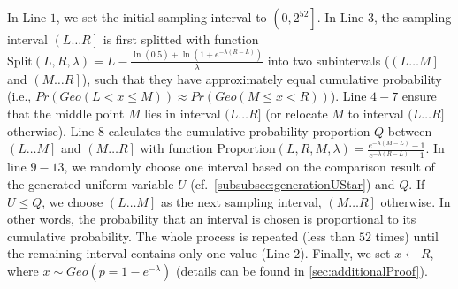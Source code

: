 In Line $1$, we set the initial sampling interval to $\left(0,2^{52}\right] $.
In Line $ 3$, the sampling interval $\left(L\ldots R\right] $ is first splitted with function $\text{Split}\left(L,R,\lambda\right)=L-\frac{\ln\left(0.5\right)+\ln\left(1+e^{-\lambda\left(R-L\right) }\right) }{\lambda}$ into two subintervals ($\left(L\ldots M\right] $ and $\left(M\ldots R\right] $), such that they have approximately equal cumulative probability (i.e., $Pr\left(Geo\left(L<x\leq M\right) \right) \approx Pr \left(Geo\left(M  \leq x  < R\right) \right)  $).
    Line $4-7$ ensure that the middle point $M$ lies in interval $(L\ldots R]$ (or relocate $M$ to interval $(L\ldots R]$ otherwise).
    Line $8$ calculates the cumulative probability proportion $Q$ between $\left(L\ldots M\right] $ and $\left(M\ldots R\right] $ with function $\text{Proportion}\left(L,R,M,\lambda\right)=\frac{e^{-\lambda\left(M-L\right) }-1}{e^{-\lambda\left(R-L\right) }-1} $.
    In line $9-13$, we randomly choose one interval based on the comparison result of the generated uniform variable $U$ (cf.~\autoref{subsubsec:generationUStar}) and $Q$.
    If $U \leq Q$, we choose $\left(L\ldots M\right] $ as the next sampling interval, $\left(M\ldots R\right] $ otherwise. In other words, the probability that an interval is chosen is proportional to its cumulative probability.
    The whole process is repeated (less than $52$ times) until the remaining interval contains only one value (Line $2$). Finally, we set $x\gets R$, where $x\sim Geo\left(p=1-e^{-\lambda}\right)$ (details can be found in \autoref{sec:additionalProof}).






